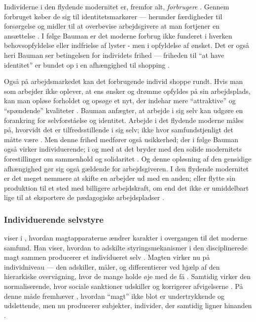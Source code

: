 Individerne i den flydende modernitet er, fremfor alt, \textit{forbrugere} \autocite[s 73ff; s. 76]{baumanLiquidModernity2000}.
Gennem forbruget køber de sig til identitetsmarkører --- herunder færdigheder til forsørgelse og midler til at overbevise arbejdsgivere at man fortjener en ansættelse \autocite[s. 74]{baumanLiquidModernity2000}.
I følge Bauman er det moderne forbrug ikke funderet i hverken behovsopfyldelse eller indfrielse af lyster - men i opfyldelse af ønsket.
Det er også heri Bauman ser betingelsen for individets frihed --- friheden til “at have identitet” er bundet op i en afhængighed til shopping \autocite[s. 84]{baumanLiquidModernity2000}.

Også på arbejdsmarkedet kan det forbrugende individ shoppe rundt.
Hvis man som arbejder ikke oplever, at ens ønsker og drømme opfyldes på sin arbejdsplads, kan man opløse forholdet og opsøge et nyt, der indehar mere “attraktive” og “spændende” kvaliteter \autocite[s. 169]{kofodOrganisationOgLedelse2016}.
Bauman anfægter, at arbejde i sig selv kan udgøre en forankring for selvforståelse og identitet.
Arbejde i det flydende moderne måles på, hvorvidt det er tilfredsstillende i sig selv; ikke hvor samfundstjenligt det måtte være \autocite[s. 139; 163f]{baumanLiquidModernity2000}.
Men denne frihed medfører også usikkerhed; der i følge Bauman også virker individuerende; i og med at det bryder med den solide modernitets forestillinger om sammenhold og solidaritet \autocite[s. 148]{baumanLiquidModernity2000}.
Og denne opløsning af den gensidige afhængighed gør sig også gældende for arbejdsgiveren.
I den flydende modernitet er det meget nemmere at skifte en arbejder ud med en anden; eller flytte sin produktion til et sted med billigere arbejdskraft, om end det ikke er umiddelbart lige til at eksportere de pædagogiske arbejdspladser \autocite[s. 161]{kofodOrganisationOgLedelse2016}.

\subsubsection{Individuerende selvstyre}

\citeauthor{foucaultOvervagningOgStraf2005} viser i , hvordan magtapparaterne ændrer karakter i overgangen til det moderne samfund.
Han viser, hvordan to adskilte styringsmekanismer i den disciplinerede magt sammen producerer et individueret selv \autocite[s. 186]{foucaultOvervagningOgStraf2005}.
Magten virker nu på individniveau — den adskiller, måler, og differentierer ved hjælp af den hierarkiske overvågning, hvor de mange holde øje med de få \autocite[s. 187ff]{foucaultOvervagningOgStraf2005}.
Samtidig virker den normaliserende, hvor sociale sanktioner udskiller og korrigerer afvigelserne \autocite[s. 194]{foucaultOvervagningOgStraf2005}.
På denne måde fremhæver \citeauthor{foucaultOvervagningOgStraf2005}, hvordan “magt” ikke blot er undertrykkende og udslettende, men nu producerer subjekter, individer, der samtidig ligner hinanden \autocite[s. 198]{foucaultOvervagningOgStraf2005}.

